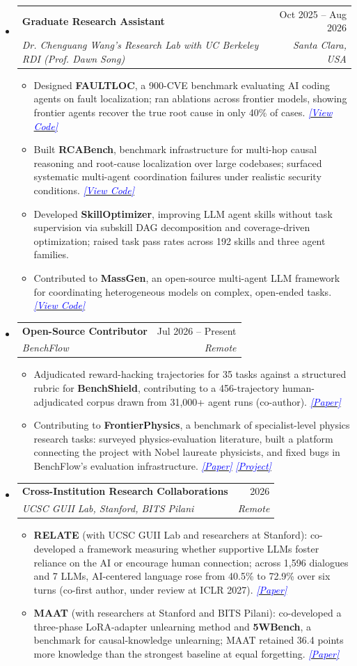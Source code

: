 \documentclass[letterpaper,11pt]{article}
\makeatletter
\newcommand{\resumeItem}[1]{
  \item{
    {#1 \vspace{-4pt}}
  }
}
\newcommand{\resumeSubheading}[4]{
  \vspace{-2pt}\item
    \begin{tabular*}{0.97\textwidth}[t]{l@{\extracolsep{\fill}}r}
      \textbf{#1} & #2 \\
      \textit{\small #3} & \textit{\small #4} \\
    \end{tabular*}\vspace{-10pt}
}
\newcommand{\resumeSubHeadingListStart}{\begin{itemize}[leftmargin=0.15in, label={}]}
\newcommand{\resumeSubHeadingListEnd}{\end{itemize}}
\newcommand{\resumeItemListStart}{\begin{itemize}}
\newcommand{\resumeItemListEnd}{\end{itemize}\vspace{-2pt}}
\newcommand{\codelink}[1]{\href{#1}{\textcolor{blue}{\textit{[View Code]}}}}
\newcommand{\paperlink}[2]{\href{#1}{\textcolor{blue}{\textit{[#2]}}}}
\makeatother
\begin{document}
\resumeSubHeadingListStart
\resumeSubheading
  {Graduate Research Assistant}{Oct 2025 -- Aug 2026}
  {Dr. Chenguang Wang's Research Lab \textbullet{} with UC Berkeley RDI (Prof. Dawn Song)}{Santa Clara, USA}
  \resumeItemListStart
    \small
    \resumeItem{Designed \textbf{FAULTLOC}, a 900-CVE benchmark evaluating AI coding agents on fault localization; ran ablations across frontier models, showing frontier agents recover the true root cause in only 40\% of cases. \codelink{https://github.com/JianhongTu/FLBench}}
    \resumeItem{Built \textbf{RCABench}, benchmark infrastructure for multi-hop causal reasoning and root-cause localization over large codebases; surfaced systematic multi-agent coordination failures under realistic security conditions. \codelink{https://github.com/wang-research-lab/RCAbench}}
    \resumeItem{Developed \textbf{SkillOptimizer}, improving LLM agent skills without task supervision via subskill DAG decomposition and coverage-driven optimization; raised task pass rates across 192 skills and three agent families.}
    \resumeItem{Contributed to \textbf{MassGen}, an open-source multi-agent LLM framework for coordinating heterogeneous models on complex, open-ended tasks. \codelink{https://github.com/massgen/MassGen}}
  \resumeItemListEnd
\resumeSubHeadingListEnd

\resumeSubHeadingListStart
\resumeSubheading
  {Open-Source Contributor}{Jul 2026 -- Present}
  {BenchFlow}{Remote}
  \resumeItemListStart
    \small
    \resumeItem{Adjudicated reward-hacking trajectories for 35 tasks against a structured rubric for \textbf{BenchShield}, contributing to a 456-trajectory human-adjudicated corpus drawn from 31{,}000+ agent runs (co-author). \paperlink{https://arxiv.org/abs/2609.11028}{Paper}}
    \resumeItem{Contributing to \textbf{FrontierPhysics}, a benchmark of specialist-level physics research tasks: surveyed physics-evaluation literature, built a platform connecting the project with Nobel laureate physicists, and fixed bugs in BenchFlow's evaluation infrastructure. \paperlink{https://arxiv.org/abs/2611.06910}{Paper} \paperlink{https://www.benchflow.ai/frontierphysics}{Project}}
  \resumeItemListEnd
\resumeSubHeadingListEnd

\resumeSubHeadingListStart
\resumeSubheading
  {Cross-Institution Research Collaborations}{2026}
  {UCSC GUII Lab, Stanford, BITS Pilani}{Remote}
  \resumeItemListStart
    \small
    \resumeItem{\textbf{RELATE} (with UCSC GUII Lab and researchers at Stanford): co-developed a framework measuring whether supportive LLMs foster reliance on the AI or encourage human connection; across 1{,}596 dialogues and 7 LLMs, AI-centered language rose from 40.5\% to 72.9\% over six turns (co-first author, under review at ICLR 2027). \paperlink{https://arxiv.org/abs/2610.09569}{Paper}}
    \resumeItem{\textbf{MAAT} (with researchers at Stanford and BITS Pilani): co-developed a three-phase LoRA-adapter unlearning method and \textbf{5WBench}, a benchmark for causal-knowledge unlearning; MAAT retained 36.4 points more knowledge than the strongest baseline at equal forgetting. \paperlink{https://arxiv.org/abs/2605.30514}{Paper}}
  \resumeItemListEnd
\resumeSubHeadingListEnd
\end{document}
